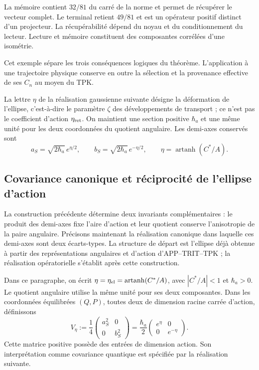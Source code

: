 La mémoire contient \(32/81\) du carré de la norme et permet de récupérer le vecteur complet. Le terminal retient \(49/81\) et est un opérateur positif distinct d’un projecteur. La récupérabilité dépend du noyau et du conditionnement du lecteur. Lecture et mémoire constituent des composantes corrélées d’une isométrie.


Cet exemple sépare les trois conséquences logiques du théorème. L’application
à une trajectoire physique conserve en outre la sélection et la
provenance effective de ses \(C_n\) au moyen du TPK.

La lettre \(\eta\) de la réalisation gaussienne suivante désigne la
déformation de l’ellipse, c’est-à-dire le paramètre \(\zeta\) des
développements de transport ; ce n’est pas le coefficient d’action
\(\eta_{\rm ret}\). On maintient une section positive \(\hbar_a\) et
une même unité pour les deux coordonnées du quotient angulaire.
Les demi-axes conservés sont
\[
 a_S=\sqrt{2\hbar_a}\,e^{\eta/2},\qquad
 b_S=\sqrt{2\hbar_a}\,e^{-\eta/2},\qquad
 \eta=\operatorname{artanh}(C^*/A).
\]

\subsection{Covariance canonique et réciprocité de l'ellipse d'action}
\label{md:antmem:covarianza-accion}

La construction précédente détermine deux invariants complémentaires :
le produit des demi-axes fixe l’aire d’action et leur quotient conserve
l’anisotropie de la paire angulaire. Précisons maintenant la réalisation canonique
dans laquelle ces demi-axes sont deux écarts-types. La structure de
départ est l’ellipse déjà obtenue à partir des représentations angulaires et
d’action d’APP--TRIT--TPK ; la réalisation opératorielle s’établit après
cette construction.

Dans ce paragraphe, on écrit \(\eta=\eta_{\rm el}
=\operatorname{artanh}(C^*/A)\), avec \(|C^*/A|<1\) et
\(\hbar_a>0\). Le quotient angulaire utilise la même unité pour ses deux
composantes. Dans les coordonnées équilibrées \((Q,P)\), toutes deux de
dimension racine carrée d'action, définissons
\begin{equation}
 V_\eta:=\frac14
 \begin{pmatrix}a_S^2&0\\0&b_S^2\end{pmatrix}
 =\frac{\hbar_a}{2}
 \begin{pmatrix}e^\eta&0\\0&e^{-\eta}\end{pmatrix}.
 \label{md:antmem:covarianza-geometrica}
\end{equation}
Cette matrice positive possède des entrées de dimension action. Son interprétation
comme covariance quantique est spécifiée par la réalisation suivante.

